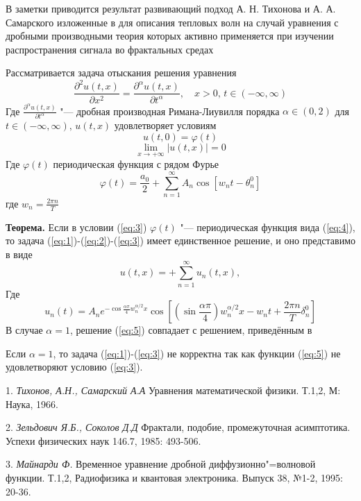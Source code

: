 
\vzmscaption

В заметки приводится результат развивающий подход А. Н. Тихонова и А. А. Самарского изложенные в \cite{tehonov} для описания тепловых волн на случай уравнения с дробными производными теория которых активно применяется при изучении распространения сигнала во фрактальных средах 

Рассматривается задача отыскания решения уравнения
\begin{equation}\label{eq:1}
	\frac{\partial ^2 u(t,x)}{\partial x^2}= \frac{\partial ^{\alpha} u(t,x)}{\partial t^{\alpha}},\quad x> 0,\, t\in (-\infty, \infty)
\end{equation}
Где $\frac{\partial ^{\alpha} u(t,x)}{\partial t^{\alpha}}$ "--- дробная производная Римана-Лиувилля порядка $\alpha \in (0,2)$ для $t\in (-\infty, \infty),\, u(t,x)$ удовлетворяет условиям
	\begin{equation}\label{eq:2}
u(t,0)=\varphi(t) 
\end{equation}
	\begin{equation}\label{eq:3}
	\lim\limits_{x\to + \infty } |u(t,x)|=0
\end{equation}
Где $\varphi(t)$ периодическая функция с рядом Фурье
	\begin{equation}\label{eq:4}
	\varphi(t) =\frac{a_0}{2}+ \sum_{n=1}^{\infty}A_n \cos \left[ w_{n}t - \theta_{n}^{0} \right]
\end{equation}
где $w_{n}= \frac{2\pi n}{T}$

\textbf{Теорема.} Если в условии (\ref{eq:3}) $\varphi(t)$ "--- периодическая функция вида (\ref{eq:4}), то задача (\ref{eq:1})-(\ref{eq:2})-(\ref{eq:3}) имеет единственное решение, и оно представимо в виде
	\begin{equation}\label{eq:5}
	u(t,x)=+ \sum_{n=1}^{\infty}u_{n}(t,x),
\end{equation}
Где
\begin{equation*}
	u_n(t)= A_n e^{-\cos\frac{\alpha \pi}{4}w_n^{\alpha/2}x}\cos \left[(\sin \frac{\alpha \pi}{4})w_n^{\alpha/2}x - w_nt +\frac{2\pi n}{T}\delta_n^0 \right]
\end{equation*}
В случае $\alpha =1$, решение (\ref{eq:5}) совпадает с решением, приведённым в \cite{tehonov} 

Если $\alpha =1$, то задача (\ref{eq:1})-(\ref{eq:3}) не корректна так как функции (\ref{eq:5}) не удовлетворяют условию (\ref{eq:3}).

\litlist

1. {\it Тихонов, А.Н., Самарский А.А}
Уравнения математической физики. Т.1,2, М: Наука, 1966.

2. {\it Зельдович Я.Б., Соколов Д.Д}
Фрактали, подобие, промежуточная асимптотика. Успехи физических наук 146.7, 1985: 493-506.

3. {\it Майнарди Ф.}
Временное уравнение дробной диффузионно"=волновой функции. Т.1,2, Радиофизика и квантовая электроника. Выпуск 38, №1-2, 1995: 20-36.
